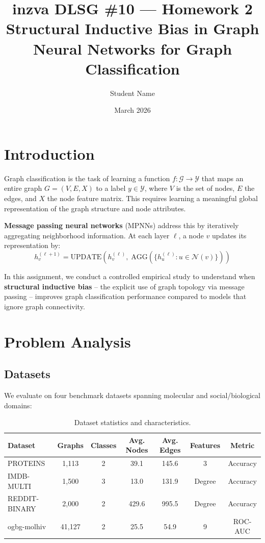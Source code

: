 \documentclass[11pt]{article}
\title{\textbf{inzva DLSG \#10 — Homework 2} \\ \large Structural Inductive Bias in Graph Neural Networks for Graph Classification}
\author{Student Name}
\date{March 2026}
\begin{document}
\maketitle

\section{Introduction}

Graph classification is the task of learning a function $f: \mathcal{G} \rightarrow \mathcal{Y}$ that maps an entire graph $G = (V, E, X)$ to a label $y \in \mathcal{Y}$, where $V$ is the set of nodes, $E$ the edges, and $X$ the node feature matrix. This requires learning a meaningful global representation of the graph structure and node attributes.

\textbf{Message passing neural networks} (MPNNs) address this by iteratively aggregating neighborhood information. At each layer $\ell$, a node $v$ updates its representation by:
\[
h_v^{(\ell+1)} = \text{UPDATE}\left(h_v^{(\ell)},\; \text{AGG}\left(\{h_u^{(\ell)} : u \in \mathcal{N}(v)\}\right)\right)
\]

In this assignment, we conduct a controlled empirical study to understand when \textbf{structural inductive bias} -- the explicit use of graph topology via message passing -- improves graph classification performance compared to models that ignore graph connectivity.

\section{Problem Analysis}

\subsection{Datasets}
We evaluate on four benchmark datasets spanning molecular and social/biological domains:

\begin{table}[H]
\centering
\caption{Dataset statistics and characteristics.}
\begin{tabular}{lcccccc}
\toprule
\textbf{Dataset} & \textbf{Graphs} & \textbf{Classes} & \textbf{Avg. Nodes} & \textbf{Avg. Edges} & \textbf{Features} & \textbf{Metric} \\
\midrule
PROTEINS & 1,113 & 2 & 39.1 & 145.6 & 3 & Accuracy \\
IMDB-MULTI & 1,500 & 3 & 13.0 & 131.9 & Degree & Accuracy \\
REDDIT-BINARY & 2,000 & 2 & 429.6 & 995.5 & Degree & Accuracy \\
ogbg-molhiv & 41,127 & 2 & 25.5 & 54.9 & 9 & ROC-AUC \\
\bottomrule
\end{tabular}
\label{tab:datasets}
\end{table}
\end{document}
